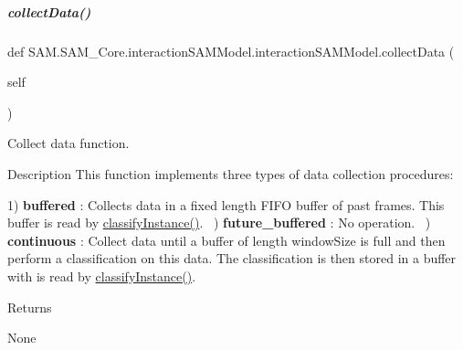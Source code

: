 \mbox{\label{group__icubclient__SAM__Core_a46552835c6838d63ab48803180c4a6ec}} 
\subparagraph{\texorpdfstring{collect\+Data()}{collectData()}}
{\footnotesize\ttfamily def S\+A\+M.\+S\+A\+M\+\_\+\+Core.\+interaction\+S\+A\+M\+Model.\+interaction\+S\+A\+M\+Model.\+collect\+Data (\begin{DoxyParamCaption}\item[{}]{self }\end{DoxyParamCaption})}



Collect data function. 

\begin{DoxyParagraph}{Description}
This function implements three types of data collection procedures\+: ~\newline
 
\end{DoxyParagraph}
\begin{DoxyParagraph}{}
1) {\bfseries buffered} \+: Collects data in a fixed length F\+I\+FO buffer of past frames. This buffer is read by \hyperlink{group__icubclient__SAM__Core_ae12b4f78693e01bfc895e1474badcaf7}{classify\+Instance()}. ~) {\bfseries future\+\_\+buffered} \+: No operation. ~) {\bfseries continuous} \+: Collect data until a buffer of length window\+Size is full and then perform a classification on this data. The classification is then stored in a buffer with is read by \hyperlink{group__icubclient__SAM__Core_ae12b4f78693e01bfc895e1474badcaf7}{classify\+Instance()}. ~\newline
 
\end{DoxyParagraph}
\begin{DoxyParagraph}{}

\end{DoxyParagraph}
\begin{DoxyReturn}{Returns}


None 
\end{DoxyReturn}


